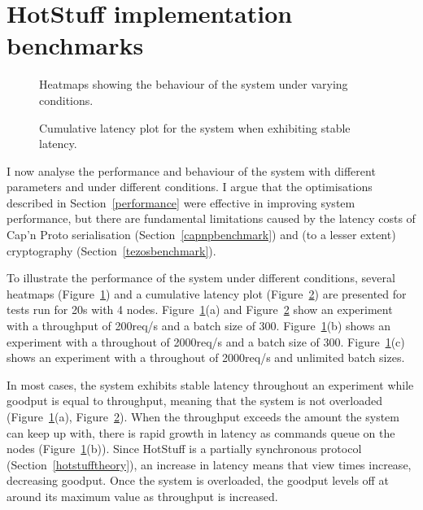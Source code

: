 \section{HotStuff implementation benchmarks} \label{hotstuffbenchmarks}

\begin{figure}[h]
\centering
\resizebox{.8\textwidth}{!}{}
\caption{Heatmaps showing the behaviour of the system under varying conditions.}
\label{heatmaps}
\end{figure}

\begin{figure}[h]
\centering
\resizebox{.6\textwidth}{!}{}
\caption{Cumulative latency plot for the system when exhibiting stable latency.}
\label{ecdfstable}
\end{figure}

I now analyse the performance and behaviour of the system with different parameters and under different conditions. I argue that the optimisations described in Section~\ref{performance} were effective in improving system performance, but there are fundamental limitations caused by the latency costs of Cap'n Proto serialisation (Section~\ref{capnpbenchmark}) and (to a lesser extent) cryptography (Section~\ref{tezosbenchmark}).

To illustrate the performance of the system under different conditions, several heatmaps (Figure~\ref{heatmaps}) and a cumulative latency plot (Figure~\ref{ecdfstable}) are presented for tests run for 20s with 4 nodes. Figure~\ref{heatmaps}(a) and Figure~\ref{ecdfstable} show an experiment with a throughput of 200req/s and a batch size of 300. Figure~\ref{heatmaps}(b) shows an experiment with a throughout of 2000req/s and a batch size of 300. Figure~\ref{heatmaps}(c) shows an experiment with a throughout of 2000req/s and unlimited batch sizes.

In most cases, the system exhibits stable latency throughout an experiment while goodput is equal to throughput, meaning that the system is not overloaded (Figure~\ref{heatmaps}(a), Figure~\ref{ecdfstable}). When the throughput exceeds the amount the system can keep up with, there is rapid growth in latency as commands queue on the nodes (Figure~\ref{heatmaps}(b)). Since HotStuff is a partially synchronous protocol (Section~\ref{hotstufftheory}), an increase in latency means that view times increase, decreasing goodput. Once the system is overloaded, the goodput levels off at around its maximum value as throughput is increased.

